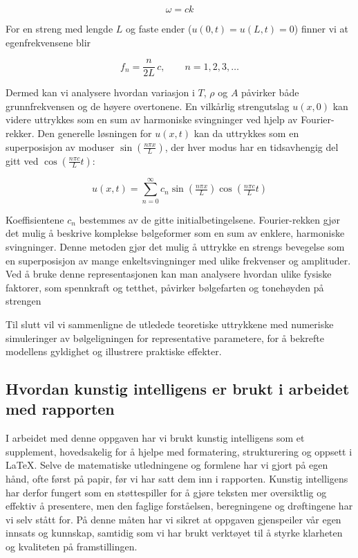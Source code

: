 \begin{equation*}
  \omega = c k
\end{equation*}

For en streng med lengde $L$ og faste ender ($u(0,t)=u(L,t)=0$) finner vi at egenfrekvensene blir

\begin{equation*}
  f_n = \frac{n}{2L}\,c, \qquad n=1,2,3,\dots \label{egenfrekvensene}
\end{equation*}

Dermed kan vi analysere hvordan variasjon i $T$, $\rho$ og $A$ påvirker både grunnfrekvensen og de høyere overtonene.  
En vilkårlig strengutslag $u(x,0)$ kan videre uttrykkes som en sum av harmoniske svingninger ved hjelp av Fourier-rekker.  
Den generelle løsningen for $u(x,t)$ kan da uttrykkes som en superposisjon av moduser 
$\sin\!\left(\tfrac{n\pi x}{L}\right)$, der hver modus har en tidsavhengig del gitt ved 
$\cos\!\left(\tfrac{n\pi c}{L}t\right)$:

\begin{equation*}
    u(x,t) = \sum_{n=0}^{\infty} c_n 
    \sin\!\left(\tfrac{n\pi x}{L}\right)
    \cos\!\left(\tfrac{n\pi c}{L}t\right)
\end{equation*}

Koeffisientene $c_n$ bestemmes av de gitte initialbetingelsene.  
Fourier-rekken gjør det mulig å beskrive komplekse bølgeformer som en sum av enklere, harmoniske svingninger.  
Denne metoden gjør det mulig å uttrykke en strengs bevegelse som en superposisjon av mange enkeltsvingninger med ulike frekvenser og amplituder.  
Ved å bruke denne representasjonen kan man analysere hvordan ulike fysiske faktorer, som spennkraft og tetthet, påvirker bølgefarten og tonehøyden på strengen \parencite{libretextsWave}

Til slutt vil vi sammenligne de utledede teoretiske uttrykkene med numeriske simuleringer 
av bølgeligningen for representative parametere, for å bekrefte modellens gyldighet og illustrere praktiske effekter.

\subsection{Hvordan kunstig intelligens er brukt i arbeidet med rapporten}
I arbeidet med denne oppgaven har vi brukt kunstig intelligens som et supplement, hovedsakelig for å hjelpe med formatering, strukturering og oppsett i LaTeX. 
Selve de matematiske utledningene og formlene har vi gjort på egen hånd, ofte først på papir, før vi har satt dem inn i rapporten. 
Kunstig intelligens har derfor fungert som en støttespiller for å gjøre teksten mer oversiktlig og effektiv å presentere, men den faglige forståelsen, beregningene og drøftingene har vi selv stått for. 
På denne måten har vi sikret at oppgaven gjenspeiler vår egen innsats og kunnskap, samtidig som vi har brukt verktøyet til å styrke klarheten og kvaliteten på framstillingen.